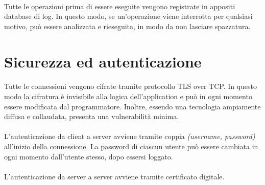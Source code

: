 \documentclass{article}
\begin{document}
\paragraph{} Tutte le operazioni prima di essere eseguite vengono registrate in appositi database di log. In questo modo, se un'operazione viene interrotta per qualsiasi motivo, può essere analizzata e rieseguita, in modo da non lasciare spazzatura. 





\section{Sicurezza ed autenticazione}

\paragraph{} Tutte le connessioni vengono cifrate tramite protocollo TLS over TCP. In questo modo la cifratura è invisibile alla logica dell'application e può in ogni momento essere modificata dal programmatore. Inoltre, essendo una tecnologia ampiamente diffusa e collaudata, presenta una vulnerabilità minima. 

\paragraph{} L'autenticazione da client a server avviene tramite coppia \emph{(username, password)} all'inizio della connessione. La password di ciascun utente può essere cambiata in ogni momento dall'utente stesso, dopo essersi loggato. 

\paragraph{} L'autenticazione da server a server avviene tramite certificato digitale. 






\end{document}
